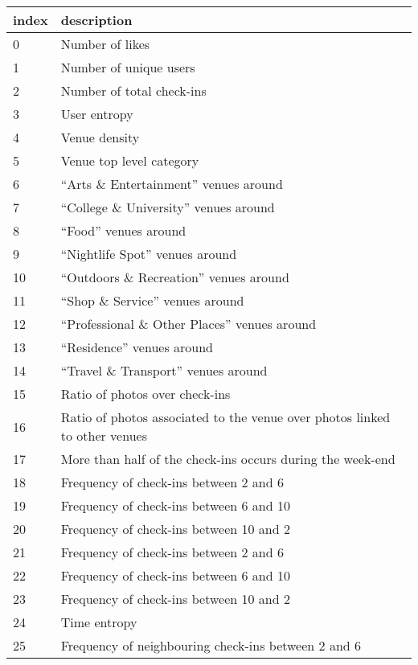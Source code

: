 \begin{table}[hb]
    \centering
    \begin{tabularx}{\textwidth}{lX}
        \toprule
        index & description \\
        \midrule
	\datasetRow{}0 & Number of likes \\
	\datasetRow{}1 & Number of unique users \\
	\datasetRow{}2 & Number of total check-ins \\
        3 & User entropy \\
        4 & Venue density \\
	\datasetRow{}5 & Venue top level category \\
        6 & \enquote{Arts \& Entertainment} venues around \\
        7 & \enquote{College \& University} venues around \\
        8 & \enquote{Food} venues around \\
        9 & \enquote{Nightlife Spot} venues around \\
        10 & \enquote{Outdoors \& Recreation} venues around \\
        11 & \enquote{Shop \& Service} venues around \\
        12 & \enquote{Professional \& Other Places} venues around \\
        13 & \enquote{Residence} venues around \\
        14 & \enquote{Travel \& Transport} venues around \\
	15 & Ratio of photos over check-ins \\
	16 & Ratio of photos associated to the venue over photos linked to other venues \\
	17 & More than half of the check-ins occurs during the week-end \\
	18 & Frequency of check-ins between 2 \am{} and 6 \am{} \\
	19 & Frequency of check-ins between 6 \am{} and 10 \am{} \\
	20 & Frequency of check-ins between 10 \am{} and 2 \hpm{} \\
	21 & Frequency of check-ins between 2 \hpm{} and 6 \hpm{} \\
	22 & Frequency of check-ins between 6 \hpm{} and 10 \hpm{} \\
	23 & Frequency of check-ins between 10 \hpm{} and 2 \am{} \\
	24 & Time entropy \\
	25 & Frequency of neighbouring check-ins between 2 \am{} and 6 \am{} \\

\end{tabularx}
\end{table}
